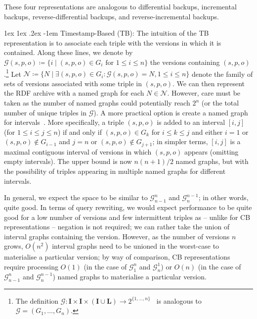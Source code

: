 \documentclass{llncs}
\makeatletter
\renewcommand\paragraph{\@startsection{paragraph}{4}{\z@}%
	{1ex \@plus1ex \@minus.2ex}%
	{-1em}%
	{\normalfont\normalsize\itshape}}
\newcommand{\I}{\ensuremath{\mathbf{I}}\xspace}
\renewcommand{\L}{\ensuremath{\mathbf{L}}\xspace}
\makeatother
\begin{document}
These four representations are analogous to differential backups, incremental backups, reverse-differential backups, and reverse-incremental backups.

\paragraph{Timestamp-Based (TB):} The intuition of the TB representation is to associate each triple with the versions in which it is contained. Along these lines, we denote by $\mathcal{G}(s,p,o) \coloneqq \{ i \mid (s,p,o) \in G_i\text{ for } 1 \leq i \leq n \}$ the versions containing $(s,p,o)$.\footnote{The definition $\mathcal{G} : \I \times \I \times (\I \cup \L) \rightarrow 2^{\{1,\ldots,n\}}$~\cite{FernandezUPK19} is analogous to $\mathcal{G} = (G_1,\ldots,G_n)$.} Let $\mathcal{N} \coloneqq \{ N \mid \exists (s,p,o) \in G_i : \mathcal{G}(s,p,o) = N, 1 \leq i \leq n  \}$ denote the family of sets of versions associated with some triple in $(s,p,o)$. We can then represent the RDF archive with a named graph for each $N \in \mathcal{N}$. However, care must be taken as the number of named graphs could potentially reach $2^n$ (or the total number of unique triples in $\mathcal{G}$). A more practical option is create a named graph for intervals~\cite{FernandezPU15}. More specifically, a triple $(s,p,o)$ is added to an interval $[i,j]$ (for $1 \leq i \leq j \leq n$) if and only if $(s,p,o) \in G_k$ for $i \leq k \leq j$ and either $i = 1$ or $(s,p,o) \notin G_{i-1}$ and $j = n$ or $(s,p,o) \notin G_{j+1}$; in simpler terms, $[i,j]$ is a maximal contiguous interval of versions in which $(s,p,o)$ appears (omitting empty intervals). The upper bound is now $n(n+1)/2$ named graphs, but with the possibility of triples appearing in multiple named graphs for different intervals.

In general, we expect the space to be similar to $\mathcal{G}^n_{n-1}$ and $\mathcal{G}^{n-1}_n$; in other words, quite good. In terms of query rewriting, we would expect performance to be quite good for a low number of versions and few intermittent triples as -- unlike for CB representations -- negation is not required; we can rather take the union of interval graphs containing the version. However, as the number of versions $n$ grows, $O(n^2)$ interval graphs need to be unioned in the worst-case to materialise a particular version; by way of comparison, CB representations require processing $O(1)$ (in the case of $\mathcal{G}^n_1$ and $\mathcal{G}^1_n$) or $O(n)$ (in the case of $\mathcal{G}^n_{n-1}$ and $\mathcal{G}^{n-1}_n$) named graphs to materialise a particular version. 
\end{document}
